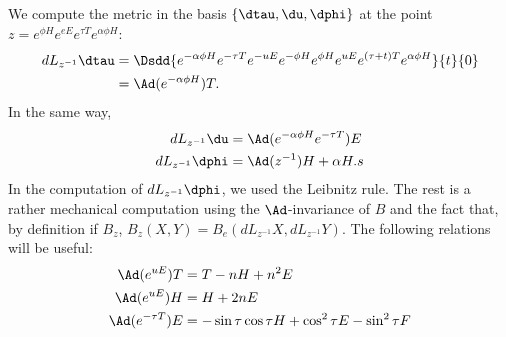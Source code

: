 We compute the metric in the basis $\{\dtau,\du,\dphi\}$ at the point $z=e^{\phi H}e^{eE}e^{\tau T}e^{\alpha\phi H}$:
\begin{equation}
	\begin{aligned}[]
		dL_{z^{-1}}\dtau & =\Dsdd{  e^{-\alpha\phi H}e^{-\tau T}e^{-uE}e^{-\phi H}e^{\phi H}e^{uE}e^{(\tau+t)T}e^{\alpha\phi H}  }{t}{0} \\
		                 & =\Ad(e^{-\alpha\phi H})T.
	\end{aligned}
\end{equation}
In the same way,
\begin{equation}
	\begin{aligned}[]
		dL_{z^{-1}}\du   & =\Ad(e^{-\alpha\phi H}e^{-\tau T})E \\
		dL_{z^{-1}}\dphi & =\Ad(z^{-1})H+\alpha H.s
	\end{aligned}
\end{equation}
In the computation of $dL_{z^{-1}}\dphi$, we used the Leibnitz rule. The rest is a rather mechanical computation using the $\Ad$-invariance of $B$ and the fact that, by definition if $B_z$, $B_z(X,Y)=B_e(dL_{z^{-1}}X,dL_{z^{-1}}Y)$. The following relations will be useful:
\begin{subequations}
	\begin{align}
		\Ad(e^{uE})T      & =T-nH+n^2E                                     \\
		\Ad(e^{uE})H      & =H+2nE                                         \\
		\Ad(e^{-\tau T})E & =-\sin\tau\cos\tau H+\cos^2\tau E-\sin^2\tau F
	\end{align}
\end{subequations}
